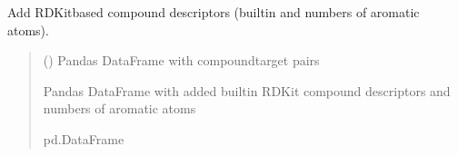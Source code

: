 \documentclass[letterpaper,10pt,english]{sphinxmanual}
\begin{document}
\begin{fulllineitems}
\label{\detokenize{add_rdkit_compound_descriptors:add_rdkit_compound_descriptors.add_rdkit_compound_descriptors}}
\pysigstartsignatures
{}
\pysigstopsignatures
\sphinxAtStartPar
Add RDKit\sphinxhyphen{}based compound descriptors (built\sphinxhyphen{}in and numbers of aromatic atoms).
\begin{quote}\begin{description}
\sphinxAtStartPar
{} () \textendash{} Pandas DataFrame with compound\sphinxhyphen{}target pairs

\sphinxAtStartPar
Pandas DataFrame with added built\sphinxhyphen{}in RDKit compound descriptors and numbers of aromatic atoms

\sphinxAtStartPar
pd.DataFrame

\end{description}\end{quote}

\end{fulllineitems}

\end{document}
